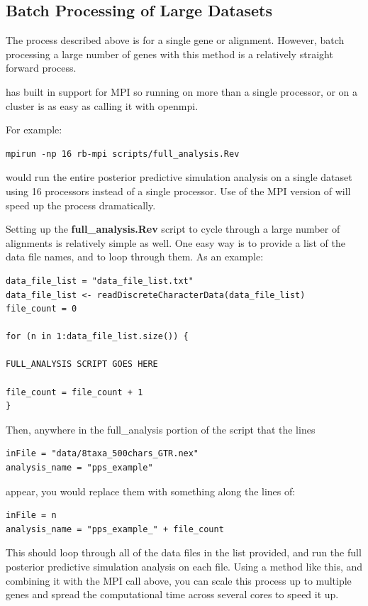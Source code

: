 \subsection{Batch Processing of Large Datasets}
The process described above is for a single gene or alignment. However, batch processing a large number of genes
with this method is a relatively straight forward process. 

\RevBayes has built in support for MPI so running \RevBayes on more than a single processor, or on a cluster is 
as easy as calling it with openmpi. 

For example:
{\tt \begin{snugshade*}
\begin{lstlisting}
mpirun -np 16 rb-mpi scripts/full_analysis.Rev
\end{lstlisting}
\end{snugshade*}}
would run the entire posterior predictive simulation analysis on a single dataset using 16 processors
instead of a single processor. Use of the MPI version of \RevBayes will speed up the process dramatically.

Setting up the \textbf{full\_analysis.Rev} script to cycle through a large number of alignments is relatively
simple as well. One easy way is to provide a list of the data file names, and to loop through 
them. As an example:

{\tt \begin{snugshade*}
\begin{lstlisting} 
data_file_list = "data_file_list.txt" 
data_file_list <- readDiscreteCharacterData(data_file_list)
file_count = 0

for (n in 1:data_file_list.size()) {

FULL_ANALYSIS SCRIPT GOES HERE

file_count = file_count + 1
}
\end{lstlisting}
\end{snugshade*}}

Then, anywhere in the full\_analysis portion of the script that the lines
{\tt \begin{snugshade*}
\begin{lstlisting} 
inFile = "data/8taxa_500chars_GTR.nex"
analysis_name = "pps_example"
\end{lstlisting}
\end{snugshade*}}
appear, you would replace them with something along the lines of: 
{\tt \begin{snugshade*}
\begin{lstlisting} 
inFile = n
analysis_name = "pps_example_" + file_count
\end{lstlisting}
\end{snugshade*}}

This should loop through all of the data files in the list provided, and run the full posterior predictive
simulation analysis on each file. Using a method like this, and combining it with the MPI call above, you can scale
this process up to multiple genes and spread the computational time across several cores to speed it up. 

\bigskip


